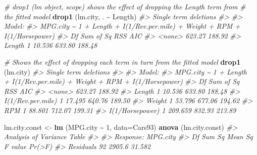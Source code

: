 \documentclass[
]{book}
\newenvironment{Shaded}{\begin{snugshade}}{\end{snugshade}}
\newcommand{\AttributeTok}[1]{\textcolor[rgb]{0.13,0.29,0.53}{#1}}
\newcommand{\CommentTok}[1]{\textcolor[rgb]{0.56,0.35,0.01}{\textit{#1}}}
\newcommand{\DecValTok}[1]{\textcolor[rgb]{0.00,0.00,0.81}{#1}}
\newcommand{\FunctionTok}[1]{\textcolor[rgb]{0.13,0.29,0.53}{\textbf{#1}}}
\newcommand{\NormalTok}[1]{#1}
\newcommand{\OtherTok}[1]{\textcolor[rgb]{0.56,0.35,0.01}{#1}}
\newcommand{\SpecialCharTok}[1]{\textcolor[rgb]{0.81,0.36,0.00}{\textbf{#1}}}
\begin{document}
\begin{Shaded}
\begin{Highlighting}[]
\CommentTok{\# drop1 (lm object, scope) shows the effect of dropping the Length term from }
\CommentTok{\# the fitted model}
\FunctionTok{drop1}\NormalTok{ (lm.city, . }\SpecialCharTok{\textasciitilde{}}\NormalTok{ Length)}
\CommentTok{\#\textgreater{} Single term deletions}
\CommentTok{\#\textgreater{} }
\CommentTok{\#\textgreater{} Model:}
\CommentTok{\#\textgreater{} MPG.city \textasciitilde{} 1 + Length + I(1/Rev.per.mile) + Weight + RPM + I(1/Horsepower)}
\CommentTok{\#\textgreater{}        Df Sum of Sq    RSS    AIC}
\CommentTok{\#\textgreater{} \textless{}none\textgreater{}              623.27 188.92}
\CommentTok{\#\textgreater{} Length  1    10.536 633.80 188.48}

\CommentTok{\# Shows the effect of dropping each term in turn from the fitted model }
\FunctionTok{drop1}\NormalTok{ (lm.city)}
\CommentTok{\#\textgreater{} Single term deletions}
\CommentTok{\#\textgreater{} }
\CommentTok{\#\textgreater{} Model:}
\CommentTok{\#\textgreater{} MPG.city \textasciitilde{} 1 + Length + I(1/Rev.per.mile) + Weight + RPM + I(1/Horsepower)}
\CommentTok{\#\textgreater{}                   Df Sum of Sq    RSS    AIC}
\CommentTok{\#\textgreater{} \textless{}none\textgreater{}                         623.27 188.92}
\CommentTok{\#\textgreater{} Length             1    10.536 633.80 188.48}
\CommentTok{\#\textgreater{} I(1/Rev.per.mile)  1    17.495 640.76 189.50}
\CommentTok{\#\textgreater{} Weight             1    53.796 677.06 194.62}
\CommentTok{\#\textgreater{} RPM                1    88.801 712.07 199.31}
\CommentTok{\#\textgreater{} I(1/Horsepower)    1   209.659 832.93 213.89}

\NormalTok{lm.city.const }\OtherTok{\textless{}{-}} \FunctionTok{lm}\NormalTok{ (MPG.city }\SpecialCharTok{\textasciitilde{}} \DecValTok{1}\NormalTok{, }\AttributeTok{data=}\NormalTok{Cars93)}
\FunctionTok{anova}\NormalTok{ (lm.city.const)}
\CommentTok{\#\textgreater{} Analysis of Variance Table}
\CommentTok{\#\textgreater{} }
\CommentTok{\#\textgreater{} Response: MPG.city}
\CommentTok{\#\textgreater{}           Df Sum Sq Mean Sq F value Pr(\textgreater{}F)}
\CommentTok{\#\textgreater{} Residuals 92 2905.6  31.582}


\end{Highlighting}
\end{Shaded}
\end{document}
